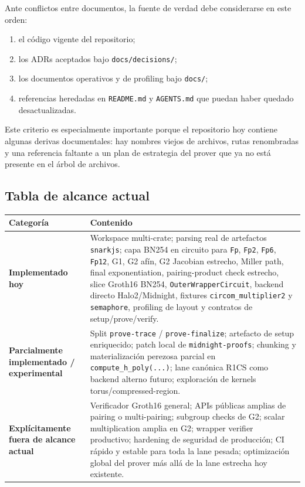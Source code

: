 \documentclass[11pt,a4paper]{article}
\begin{document}
Ante conflictos entre documentos, la fuente de verdad debe considerarse en este orden:

\begin{enumerate}
  \item el c\'odigo vigente del repositorio;
  \item los ADRs aceptados bajo \texttt{docs/decisions/};
  \item los documentos operativos y de profiling bajo \texttt{docs/};
  \item referencias heredadas en \texttt{README.md} y \texttt{AGENTS.md} que puedan haber quedado desactualizadas.
\end{enumerate}

Este criterio es especialmente importante porque el repositorio hoy contiene algunas derivas
documentales: hay nombres viejos de archivos, rutas renombradas y una referencia faltante
a un plan de estrategia del prover que ya no est\'a presente en el \'arbol de archivos.

\subsection{Tabla de alcance actual}

\begin{longtable}{>{\raggedright\arraybackslash}p{} >{\raggedright\arraybackslash}p{}}
\toprule
\textbf{Categor\'ia} & \textbf{Contenido} \\
\midrule
\endhead

\textbf{Implementado hoy} &
Workspace multi-crate; parsing real de artefactos \texttt{snarkjs}; capa BN254 en circuito para
\texttt{Fp}, \texttt{Fp2}, \texttt{Fp6}, \texttt{Fp12}, G1, G2 af\'in, G2 Jacobian estrecho,
Miller path, final exponentiation, pairing-product check estrecho, slice Groth16 BN254,
\texttt{OuterWrapperCircuit}, backend directo Halo2/Midnight, fixtures \texttt{circom\_multiplier2}
y \texttt{semaphore}, profiling de layout y contratos de setup/prove/verify. \\

\textbf{Parcialmente implementado / experimental} &
Split \texttt{prove-trace} / \texttt{prove-finalize}; artefacto de setup enriquecido; patch local
de \texttt{midnight-proofs}; chunking y materializaci\'on perezosa parcial en \texttt{compute\_h\_poly(...)}; lane can\'onica R1CS como backend alterno futuro; exploraci\'on de kernels torus/compressed-region. \\

\textbf{Expl\'icitamente fuera de alcance actual} &
Verificador Groth16 general; APIs p\'ublicas amplias de pairing o multi-pairing; subgroup checks de G2;
scalar multiplication amplia en G2; wrapper verifier productivo; hardening de seguridad de producci\'on;
CI r\'apido y estable para toda la lane pesada; optimizaci\'on global del prover m\'as all\'a de la lane estrecha hoy existente. \\

\bottomrule
\end{longtable}
\end{document}
